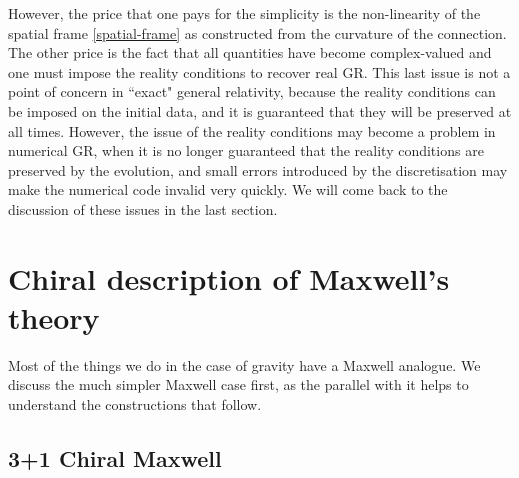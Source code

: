 \documentclass[10pt]{report}
\theoremstyle{definition}
\begin{document}
However, the price that one pays for the simplicity is the non-linearity of the spatial frame \cref{spatial-frame} as constructed from the curvature of the connection. The other price is the fact that all quantities have become complex-valued and one must impose the reality conditions to recover real GR. This last issue is not a point of concern in ``exact" general relativity, because the reality conditions can be imposed on the initial data, and it is guaranteed that they will be preserved at all times. However, the issue of the reality conditions may become a problem in numerical GR, when it is no longer guaranteed that the reality conditions are preserved by the evolution, and small errors introduced by the discretisation may make the numerical code invalid very quickly. We will come back to the discussion of these issues in the last section. 

\section{Chiral description of Maxwell's theory} \label{sec:num-pure-con-maxwell}

Most of the things we do in the case of gravity have a Maxwell analogue. We discuss the much simpler Maxwell case first, as the parallel with it helps to understand the constructions that follow. 

\subsection{3+1 Chiral Maxwell}
\end{document}
